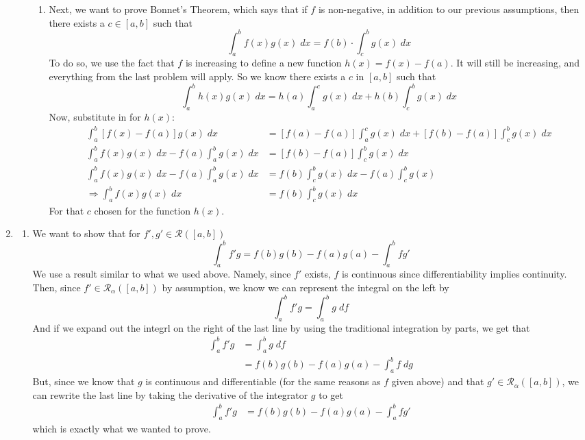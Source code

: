 \documentclass[12pt]{article}
\theoremstyle{plain}
\theoremstyle{definition}
\theoremstyle{remark}
\begin{document}
\begin{enumerate}
\begin{enumerate}
\begin{enumerate}
\item Next, we want to prove Bonnet's Theorem, which says that if $f$ is non-negative, in addition to our previous assumptions, then there exists a $c\in[a,b]$ such that
\[
    \int^b_a f(x)g(x)\;dx = f(b)\cdot\int^b_c g(x)\;dx
\]
To do so, we use the fact that $f$ is increasing to define a new function $h(x) = f(x)-f(a)$. It will still be increasing, and everything from the last problem will apply. So we know there exists a $c$ in $[a,b]$ such that
\[
    \int^b_a h(x)g(x) \;dx = h(a) \int^c_a g(x) \; dx 
        + h(b) \int^b_c g(x) \; dx
\]
Now, substitute in for $h(x)$:
\begin{align*}
    \int^b_a [f(x)-f(a)]g(x) \;dx &= [f(a)-f(a)] \int^c_a g(x) \; dx 
        +[f(b)-f(a)] \int^b_c g(x) \; dx\\
    \int^b_a f(x)g(x) \;dx - f(a)\int^b_a g(x) \;dx
        &= [f(b)-f(a)] \int^b_c g(x) \; dx\\
    \int^b_a f(x)g(x) \;dx - f(a)\int^b_a g(x) \;dx
        &= f(b)\int^b_c g(x) \; dx - f(a) \int^b_c g(x) \\
    \Rightarrow
    \int^b_a f(x)g(x) \;dx 
        &= f(b)\int^b_c g(x) \; dx 
\end{align*}
For that $c$ chosen for the function $h(x)$.
    
    
\end{enumerate}


\end{enumerate}



\newpage    
\item  
\begin{enumerate}
\item
We want to show that for $f', g'\in\mathscr{R}([a,b])$
\begin{equation}
    \int^b_a f'g = f(b)g(b) - f(a)g(a) - \int^b_a f g'
\end{equation}
We use a result similar to what we used above. Namely, since $f'$ exists, $f$ is continuous since differentiability implies continuity. Then, since $f'\in\mathscr{R}_\alpha([a,b])$ by assumption, we know we can represent the integral on the left by
\[ 
    \int^b_a f' g = \int^b_a g \; df 
\]
And if we expand out the integrl on the right of the last line by using the traditional integration by parts, we get that
\begin{align*}
    \int^b_a f' g &= \int^b_a g \; df \\
    &= f(b)g(b) - f(a)g(a) - \int^b_a f\;dg
\end{align*}
But, since we know that $g$ is continuous and differentiable (for the same reasons as $f$ given above) and that $g'\in\mathscr{R}_\alpha([a,b])$, we can rewrite the last line by taking the derivative of the integrator $g$ to get
\begin{align*}
    \int^b_a f' g &= 
     f(b)g(b) - f(a)g(a) - \int^b_a fg'
\end{align*}
which is exactly what we wanted to prove.

\end{enumerate}
        
        

\end{enumerate}
\end{document}
